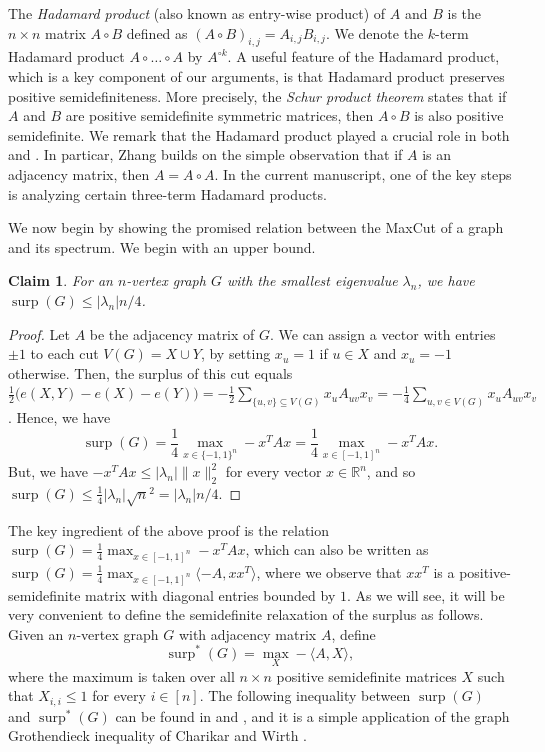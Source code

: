 \documentclass[11pt]{article}
\theoremstyle{plain}
\newtheorem{claim}[theorem]{Claim}
\theoremstyle{definition}
\DeclareMathOperator{\surp}{surp}
\newcommand{\bR}{\mathbb{R}}
\begin{document}
The \emph{Hadamard product} (also known as entry-wise product) of $A$ and $B$ is the $n\times n$ matrix $A\circ B$ defined as $(A\circ B)_{i,j}=A_{i,j}B_{i,j}$. We denote the $k$-term Hadamard product $A\circ\dots\circ A$ by $A^{\circ k}$. A useful feature of the Hadamard product, which is a key component of our arguments, is that Hadamard product preserves positive semidefiniteness. More precisely, the \emph{Schur product theorem} states that if $A$ and $B$ are positive semidefinite symmetric matrices, then $A\circ B$ is also positive semidefinite. We remark that the Hadamard product played a crucial role in both \cite{RST} and \cite{Zhang}. In particar, Zhang \cite{Zhang} builds on the simple observation that if $A$ is an adjacency matrix, then $A=A\circ A$. In the current manuscript, one of the key steps is analyzing certain three-term Hadamard products.

We now begin by showing the promised relation between the MaxCut of a graph and its spectrum. We begin with an upper bound.

\begin{claim}\label{claim:surplus_and_lambdan}
For an $n$-vertex graph $G$ with the smallest eigenvalue $\lambda_n$, we have $\surp(G)\leq |\lambda_n|n/4$. 
\end{claim}
\begin{proof}
Let $A$ be the adjacency matrix of $G$. We can assign a vector with entries $\pm 1$ to each cut $V(G)=X\cup Y$, by setting $x_u=1$ if $u\in X$ and $x_u=-1$ otherwise. Then, the surplus of this cut equals $\frac{1}{2}\big(e(X, Y)-e(X)-e(Y)\big)=-\frac{1}{2}\sum_{\{u, v\}\subseteq V(G)} x_uA_{uv}x_v=-\frac{1}{4}\sum_{u, v\in V(G)} x_uA_{uv}x_v$. 
Hence, we have 
\[\surp(G)=\frac{1}{4}\max_{x\in \{-1,1\}^n}-x^T Ax=\frac{1}{4}\max_{x\in [-1,1]^n}-x^T Ax.\]
But, we have $-x^TAx\leq |\lambda_n|\|x\|_2^2$ for every vector $x\in \bR^n$, and so $\surp(G)\leq \frac{1}{4} |\lambda_n| \sqrt{n}^2=|\lambda_n|n/4$.
\end{proof}

The key ingredient of the above proof is the relation $\surp(G)=\frac{1}{4}\max_{x\in [-1,1]^n}-x^T Ax$, which can also be written as $\surp(G)=\frac{1}{4}\max_{x\in [-1, 1]^n}\langle -A, xx^T\rangle$, where we observe that $xx^T$ is a positive-semidefinite matrix with diagonal entries bounded by $1$. As we will see, it will be very convenient to define the semidefinite relaxation of the surplus as follows. Given an $n$-vertex graph $G$ with adjacency matrix $A$, define $$\surp^*(G)=\max_{X} -\langle A,X\rangle,$$ where the maximum is taken over all $n\times n$ positive semidefinite matrices $X$ such that $X_{i,i}\leq 1$ for every $i\in [n]$. The following inequality between $\surp(G)$ and $\surp^*(G)$ can be found in \cite{RT} and \cite{Zhang}, and it is a simple application of the graph Grothendieck inequality of Charikar and Wirth \cite{CW04}. 
\end{document}
